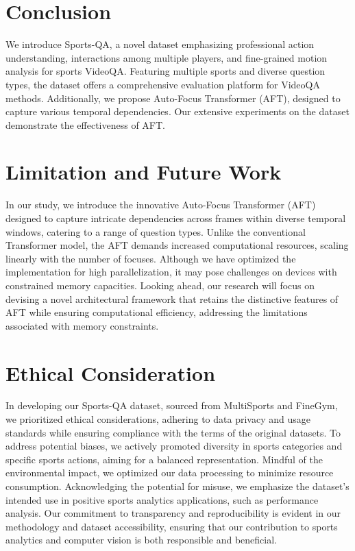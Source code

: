 \section{Conclusion}

We introduce Sports-QA, a novel dataset emphasizing professional action understanding, interactions among multiple players, and fine-grained motion analysis for sports VideoQA. Featuring multiple sports and diverse question types, the dataset offers a comprehensive evaluation platform for VideoQA methods. Additionally, we propose Auto-Focus Transformer (AFT), designed to capture various temporal dependencies. Our extensive experiments on the dataset demonstrate the effectiveness of AFT.

\section{Limitation and Future Work}
\label{limit}

In our study, we introduce the innovative Auto-Focus Transformer (AFT) designed to capture intricate dependencies across frames within diverse temporal windows, catering to a range of question types. Unlike the conventional Transformer model, the AFT demands increased computational resources, scaling linearly with the number of focuses. Although we have optimized the implementation for high parallelization, it may pose challenges on devices with constrained memory capacities. Looking ahead, our research will focus on devising a novel architectural framework that retains the distinctive features of AFT while ensuring computational efficiency, addressing the limitations associated with memory constraints.

\section{Ethical Consideration}
\label{ethical}

In developing our Sports-QA dataset, sourced from MultiSports and FineGym, we prioritized ethical considerations, adhering to data privacy and usage standards while ensuring compliance with the terms of the original datasets. To address potential biases, we actively promoted diversity in sports categories and specific sports actions, aiming for a balanced representation.
Mindful of the environmental impact, we optimized our data processing to minimize resource consumption. Acknowledging the potential for misuse, we emphasize the dataset's intended use in positive sports analytics applications, such as performance analysis. Our commitment to transparency and reproducibility is evident in our methodology and dataset accessibility, ensuring that our contribution to sports analytics and computer vision is both responsible and beneficial.

